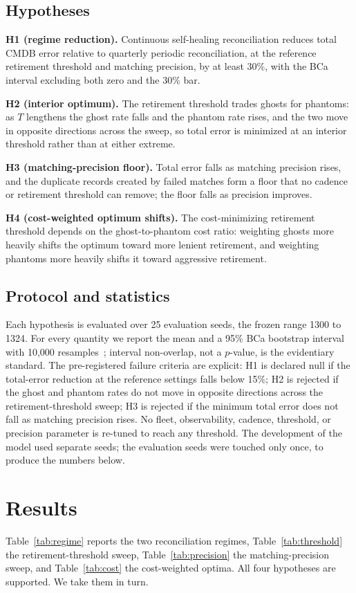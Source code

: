 \documentclass[journal]{IEEEtran}
\begin{document}
\subsection{Hypotheses}
\textbf{H1 (regime reduction).} Continuous self-healing reconciliation reduces total CMDB error
relative to quarterly periodic reconciliation, at the reference retirement threshold and matching
precision, by at least 30\%, with the BCa interval excluding both zero and the 30\% bar.

\textbf{H2 (interior optimum).} The retirement threshold trades ghosts for phantoms: as $T$
lengthens the ghost rate falls and the phantom rate rises, and the two move in opposite directions
across the sweep, so total error is minimized at an interior threshold rather than at either extreme.

\textbf{H3 (matching-precision floor).} Total error falls as matching precision rises, and the
duplicate records created by failed matches form a floor that no cadence or retirement threshold can
remove; the floor falls as precision improves.

\textbf{H4 (cost-weighted optimum shifts).} The cost-minimizing retirement threshold depends on the
ghost-to-phantom cost ratio: weighting ghosts more heavily shifts the optimum toward more lenient
retirement, and weighting phantoms more heavily shifts it toward aggressive retirement.

\subsection{Protocol and statistics}
Each hypothesis is evaluated over 25 evaluation seeds, the frozen range 1300 to 1324. For every
quantity we report the mean and a 95\% BCa bootstrap interval with 10{,}000
resamples~\cite{efron1987bca,efron1994introduction}; interval non-overlap, not a $p$-value, is the
evidentiary standard. The pre-registered failure criteria are explicit: H1 is declared null if the
total-error reduction at the reference settings falls below 15\%; H2 is rejected if the ghost and
phantom rates do not move in opposite directions across the retirement-threshold sweep; H3 is
rejected if the minimum total error does not fall as matching precision rises. No fleet, observability,
cadence, threshold, or precision parameter is re-tuned to reach any threshold. The development of the
model used separate seeds; the evaluation seeds were touched only once, to produce the numbers below.

\section{Results}
Table~\ref{tab:regime} reports the two reconciliation regimes,
Table~\ref{tab:threshold} the retirement-threshold sweep,
Table~\ref{tab:precision} the matching-precision sweep, and
Table~\ref{tab:cost} the cost-weighted optima. All four hypotheses are supported. We take them in
turn.
\end{document}

